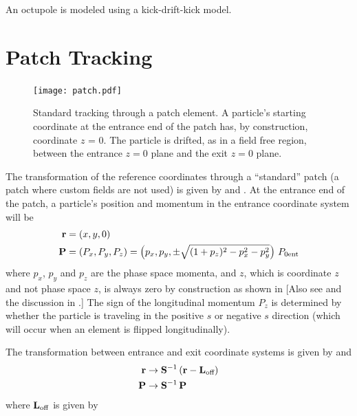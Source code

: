 An octupole is modeled using a kick-drift-kick model.

\section{Patch Tracking}
\label{s:patch.std}

\begin{figure}[tb]
  \centering
  \texttt{[image: patch.pdf]}
  \caption[Standard patch transformation.]
{Standard tracking through a patch element. A particle's starting coordinate at the entrance end of
the patch has, by construction, coordinate $z$ = 0. The particle is drifted, as in a field free
region, between the entrance $z = 0$ plane and the exit $z = 0$ plane.}
  \label{f:patch.track}
\end{figure}


The transformation of the reference coordinates through a ``standard'' patch (a patch where custom
fields are not used) is given by  and . At the entrance end of the patch, a
particle's position and momentum in the entrance coordinate system will be
\begin{alignat}{1}
  {\bf r} &= (x, y, 0) \nonumber \\
  {\bf P} &= (P_x, P_y, P_z) = 
    \left( p_x, p_y, \pm \sqrt{(1+p_z)^2 - p_x^2 - p_y^2} \right) \, P_{0\text{ent}}
\end{alignat}
where $p_x$, $p_y$ and $p_z$ are the phase space momenta, and $z$, which is coordinate $z$ and not
phase space $z$, is always zero by construction as shown in  [Also see
 and the discussion in .] The sign of the longitudinal
momentum $P_z$ is determined by whether the particle is traveling in the positive $s$ or negative
$s$ direction (which will occur when an element is flipped longitudinally).

The transformation between entrance and exit coordinate systems is given by  and 
\begin{alignat}{1}
  {\bf r} &\rightarrow 
    {\bf S}^{-1} \, ({\bf r} - {\bf L}_\text{off}) \nonumber \\
  {\bf P} &\rightarrow {\bf S}^{-1} \, {\bf P}
\end{alignat}
where ${\bf L}_\text{off}$ is given by 

